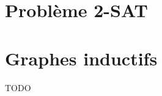 \documentclass{tipe}
\begin{document}

\clearpage

\part{Problème 2-SAT}


\part{Graphes inductifs}
TODO
\end{document}
